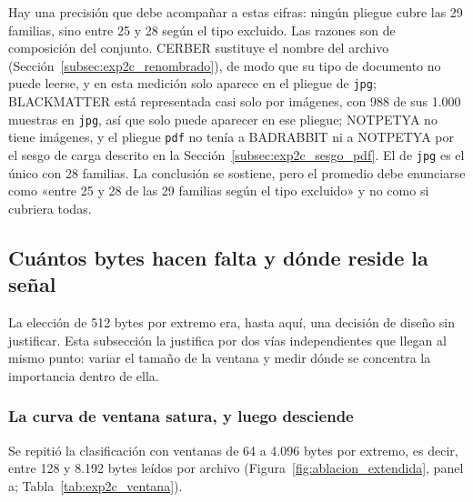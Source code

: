 Hay una precisión que debe acompañar a estas cifras: ningún pliegue cubre las 29 familias, sino entre 25 y 28 según el tipo excluido. Las razones son de composición del conjunto. CERBER sustituye el nombre del archivo (Sección~\ref{subsec:exp2c_renombrado}), de modo que su tipo de documento no puede leerse, y en esta medición solo aparece en el pliegue de \texttt{jpg}; BLACKMATTER está representada casi solo por imágenes, con 988 de sus 1.000 muestras en \texttt{jpg}, así que solo puede aparecer en ese pliegue; NOTPETYA no tiene imágenes, y el pliegue \texttt{pdf} no tenía a BADRABBIT ni a NOTPETYA por el sesgo de carga descrito en la Sección~\ref{subsec:exp2c_sesgo_pdf}. El de \texttt{jpg} es el único con 28 familias. La conclusión se sostiene, pero el promedio debe enunciarse como «entre 25 y 28 de las 29 familias según el tipo excluido» y no como si cubriera todas.

\subsection{Cuántos bytes hacen falta y dónde reside la señal}
\label{subsec:exp2c_ventana}

La elección de 512 bytes por extremo era, hasta aquí, una decisión de diseño sin justificar. Esta subsección la justifica por dos vías independientes que llegan al mismo punto: variar el tamaño de la ventana y medir dónde se concentra la importancia dentro de ella.

\subsubsection*{La curva de ventana satura, y luego desciende}

Se repitió la clasificación con ventanas de 64 a 4.096 bytes por extremo, es decir, entre 128 y 8.192 bytes leídos por archivo (Figura~\ref{fig:ablacion_extendida}, panel a; Tabla~\ref{tab:exp2c_ventana}).

